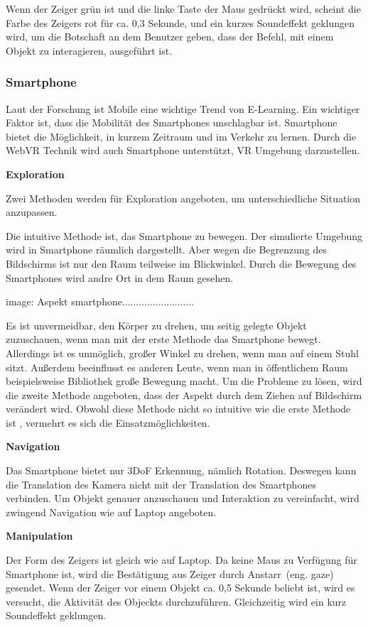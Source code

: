   Wenn der Zeiger grün ist und die linke Taste der Maus gedrückt wird, scheint die Farbe des Zeigers rot für ca. 0,3 Sekunde, und ein kurzes Soundeffekt geklungen wird, um die Botschaft an dem Benutzer geben, dass der Befehl, mit einem Objekt zu interagieren, ausgeführt ist. 
  
 \subsubsection{Smartphone}
 Laut der Forschung ist Mobile eine wichtige Trend von E-Learning. Ein wichtiger Faktor ist, dass die Mobilität des Smartphones unschlagbar ist. Smartphone bietet die Möglichkeit, in kurzem Zeitraum und im Verkehr zu lernen. Durch die WebVR Technik wird auch Smartphone unterstützt, VR Umgebung darzustellen.
 
  \textbf{Exploration}
  
  Zwei Methoden werden für Exploration angeboten, um unterschiedliche Situation anzupassen.
  
  Die intuitive Methode ist, das Smartphone zu bewegen. Der simulierte Umgebung wird in Smartphone räumlich dargestellt. Aber wegen die Begrenzung des Bildschirms ist nur den Raum teilweise im Blickwinkel. Durch die Bewegung des Smartphones wird andre Ort in dem Raum gesehen.
  
  image: Aspekt smartphone..........................
  
  Es ist unvermeidbar, den Körper zu drehen, um seitig gelegte Objekt zuzuschauen, wenn man mit der erste Methode das Smartphone bewegt. Allerdings ist es unmöglich, großer Winkel zu drehen, wenn man auf einem Stuhl sitzt. Außerdem beeinflusst es anderen Leute, wenn man in öffentlichem Raum beispielsweise Bibliothek große Bewegung macht. Um die Probleme zu lösen, wird die zweite Methode angeboten, dass der Aspekt durch dem Ziehen auf Bildschirm verändert wird. Obwohl diese Methode nicht so intuitive wie die erste Methode ist , vermehrt es sich die Einsatzmöglichkeiten.
  
  \textbf{Navigation}
  
  Das Smartphone bietet nur 3DoF Erkennung, nämlich Rotation. Deswegen kann die Translation des Kamera nicht mit der Translation des Smartphones verbinden. Um Objekt genauer anzuschauen und Interaktion zu vereinfacht, wird zwingend Navigation wie auf Laptop angeboten.
  
  \textbf{Manipulation}
  
  Der Form des Zeigers ist gleich wie auf Laptop. Da keine Maus zu Verfügung für Smartphone ist, wird die Bestätigung aus Zeiger durch \glqq Anstarr\grqq\ (eng. gaze) gesendet. Wenn der Zeiger vor einem Objekt ca. 0,5 Sekunde beliebt ist, wird es versucht, die Aktivität des Objeckts durchzuführen. Gleichzeitig wird ein kurz Soundeffekt geklungen.
  
